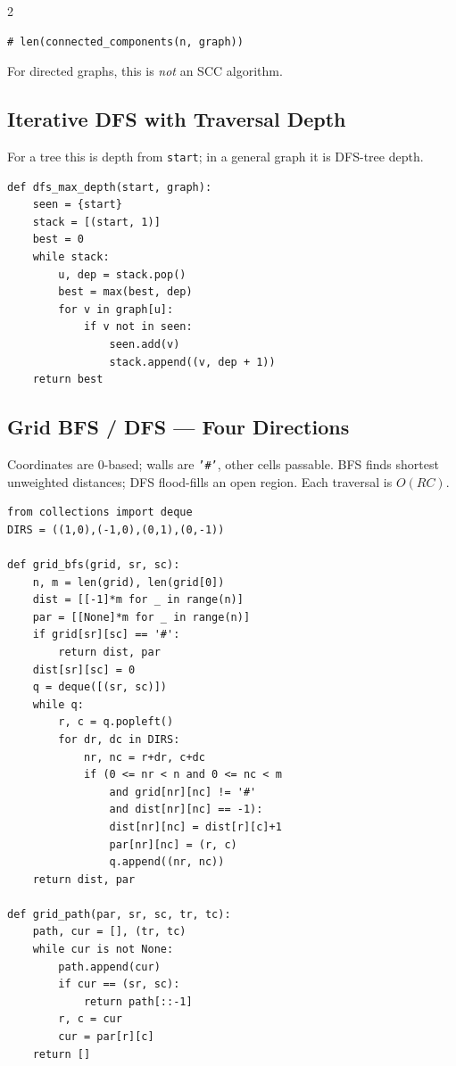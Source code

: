 \documentclass[9pt,a4paper]{extarticle}
\newcommand{\code}[1]{\texttt{#1}}
\begin{document}
\begin{multicols}{2}
\begin{minipage}[t]{\linewidth}
\begin{lstlisting}
# len(connected_components(n, graph))
\end{lstlisting}
For directed graphs, this is \emph{not} an SCC algorithm.
\end{minipage}\par

\subsection{Iterative DFS with Traversal Depth}
For a tree this is depth from \code{start}; in a general graph it is DFS-tree depth.
\begin{lstlisting}
def dfs_max_depth(start, graph):
    seen = {start}
    stack = [(start, 1)]
    best = 0
    while stack:
        u, dep = stack.pop()
        best = max(best, dep)
        for v in graph[u]:
            if v not in seen:
                seen.add(v)
                stack.append((v, dep + 1))
    return best
\end{lstlisting}

\par\noindent\begin{minipage}[t]{\linewidth}
\subsection{Grid BFS / DFS --- Four Directions}
Coordinates are 0-based; walls are \texttt{'\#'}, other cells
passable. BFS finds shortest unweighted distances; DFS flood-fills
an open region. Each traversal is $O(RC)$.
\begin{lstlisting}
from collections import deque
DIRS = ((1,0),(-1,0),(0,1),(0,-1))

def grid_bfs(grid, sr, sc):
    n, m = len(grid), len(grid[0])
    dist = [[-1]*m for _ in range(n)]
    par = [[None]*m for _ in range(n)]
    if grid[sr][sc] == '#':
        return dist, par
    dist[sr][sc] = 0
    q = deque([(sr, sc)])
    while q:
        r, c = q.popleft()
        for dr, dc in DIRS:
            nr, nc = r+dr, c+dc
            if (0 <= nr < n and 0 <= nc < m
                and grid[nr][nc] != '#'
                and dist[nr][nc] == -1):
                dist[nr][nc] = dist[r][c]+1
                par[nr][nc] = (r, c)
                q.append((nr, nc))
    return dist, par

def grid_path(par, sr, sc, tr, tc):
    path, cur = [], (tr, tc)
    while cur is not None:
        path.append(cur)
        if cur == (sr, sc):
            return path[::-1]
        r, c = cur
        cur = par[r][c]
    return []
\end{lstlisting}
\end{minipage}\par


\end{multicols}
\end{document}
